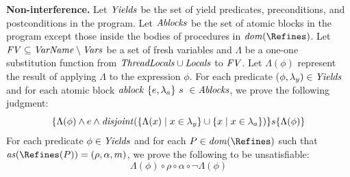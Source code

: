 {\bf Non-interference.}
Let $\mathit{Yields}$ be the set of yield predicates, preconditions, and postconditions in the program.
Let $\mathit{Ablocks}$ be the set of atomic blocks in the program except those inside the bodies of procedures
in $\dom(\Refines)$.
Let $\mathit{FV} \subseteq \mathit{VarName} \setminus \mathit{Vars}$ be a set of fresh variables and $\Lambda$ be a one-one 
substitution function from $\mathit{ThreadLocals} \cup \mathit{Locals}$ to $\mathit{FV}$.
Let $\Lambda(\phi)$ represent the result of applying $\Lambda$ to the expression $\phi$.
For each predicate ($\phi,\lambda_y) \in \mathit{Yields}$
and for each atomic block $\mathit{ablock}\ {\{e,\lambda_a\}}\ {s}\  \in \mathit{Ablocks}$, we prove the following judgment:
\[
\{\Lambda(\phi) \wedge e \wedge
  \mathit{disjoint}(\{\Lambda(x) \mid x \in \lambda_y\} \cup
  \{x \mid x \in \lambda_a\})
\} s \{\Lambda(\phi)\}
\]
For each predicate $\phi \in \mathit{Yields}$ and for each $P \in \dom(\Refines)$ such that
$\actions(\Refines(P)) = (\rho, \alpha, m)$, we prove the following to be unsatisfiable:
\[
\Lambda(\phi) \circ \rho \circ \alpha \circ \neg\Lambda(\phi)
\]

